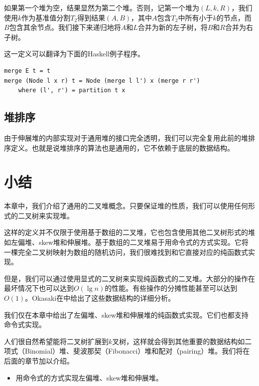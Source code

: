 \documentclass[b5paper]{ctexart}
\begin{document}
如果第一个堆为空，结果显然为第二个堆。否则，记第一个堆为$(L, k, R)$，我们使用$k$作为基准值分割$T_2$得到结果$(A, B)$，其中$A$包含$T_2$中所有小于$k$的节点，而$B$包含其余节点。我们接下来递归地将$A$和$L$合并为新的左子树，将$B$和$R$合并为右子树。

这一定义可以翻译为下面的Haskell例子程序。

\lstset{language=Haskell}
\begin{lstlisting}[style=Haskell]
merge E t = t
merge (Node l x r) t = Node (merge l l') x (merge r r')
    where (l', r') = partition t x
\end{lstlisting}

\subsection{堆排序}

由于伸展堆的内部实现对于通用堆的接口完全透明，我们可以完全复用此前的堆排序定义。也就是说堆排序的算法也是通用的，它不依赖于底层的数据结构。

\section{小结}

本章中，我们介绍了通用的二叉堆概念。只要保证堆的性质，我们可以使用任何形式的二叉树来实现堆。

这样的定义并不仅限于使用基于数组的二叉堆，它也包含使用其他二叉树形式的堆如左偏堆、skew堆和伸展堆。基于数组的二叉堆易于用命令式的方式实现。它将一棵完全二叉树映射为数组的随机访问，我们很难找到和它直接对应的纯函数式实现。

但是，我们可以通过使用显式的二叉树来实现纯函数式的二叉堆。大部分的操作在最坏情况下也可以达到$O(\lg n)$的性能。有些操作的分摊性能甚至可以达到$O(1)$。Okasaki在\cite{okasaki-book}中给出了这些数据结构的详细分析。

我们仅在本章中给出了左偏堆、skew堆和伸展堆的纯函数式实现。它们也都支持命令式实现。

人们很自然希望能将二叉树扩展到$k$叉树，这样就会得到其他重要的数据结构如二项式（Binomial）堆、斐波那契（Fibonacci）堆和配对（pairing）堆。我们将在后面的章节加以介绍。

\begin{Exercise}
\begin{itemize}
\item 用命令式的方式实现左偏堆、skew堆和伸展堆。
\end{itemize}
\end{Exercise}
\end{document}
